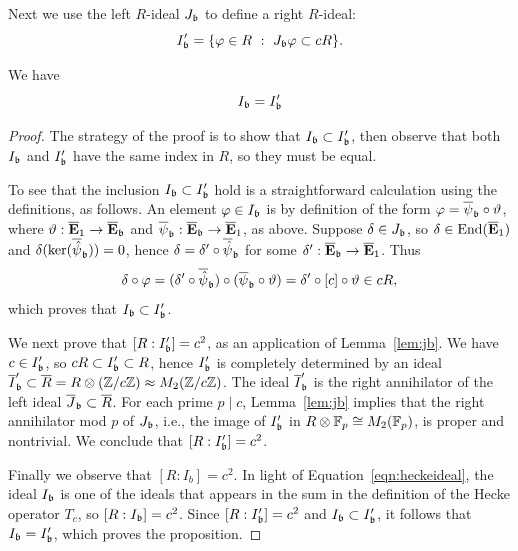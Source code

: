 \documentclass{article} \usepackage[active]{srcltx}
\newcommand{\eE}{\mathbf{E}}
\begin{document}
Next we use the left $R$-ideal $J_{\mathfrak{b}}$ to define a right $R$-ideal:
$$
 I'_{\mathfrak{b}} = \{\varphi \in R\,\, : \,\, J_{\mathfrak{b}} \varphi \subset c R\}.
$$
\begin{proposition}\label{prop:Ichar}
We have 
$$
  I_{\mathfrak{b}} = I'_{\mathfrak{b}}
$$
\end{proposition}
\begin{proof}
  The strategy of the proof is to show that $I_{\mathfrak{b}} \subset
  I'_{\mathfrak{b}}$, then observe that both $I_{\mathfrak{b}}$ and $I'_{\mathfrak{b}}$ have the
  same index in $R$, so they must be equal.

  To see that the inclusion $I_{\mathfrak{b}} \subset I'_{\mathfrak{b}}$ hold is a
  straightforward calculation using the definitions, as follows.  An
  element $\varphi \in I_{\mathfrak{b}}$ is by definition of the form $\varphi
  = \overline{\psi}_{\mathfrak{b}}\circ \vartheta$, where
  $\vartheta:\overline{\eE}_1 \to \overline{\eE}_{\fb}$ and
  $\overline{\psi}_{\fb}: \overline{\eE}_{\fb} \to \overline{\eE}_1$,
  as above.  Suppose $\delta \in J_{\mathfrak{b}}$, so
  $\delta\in \End(\overline{\eE}_1)$ and
  $\delta(\ker(\overline{\hat{\psi}}_{\mathfrak{b}})) = 0$, hence $\delta=
  \delta' \circ \overline{\hat{\psi}}_{\mathfrak{b}}$ for some
  $\delta':\overline{\eE}_\fb \to \overline{\eE}_1$.  Thus
  $$
   \delta \circ \varphi = 
    (\delta' \circ \overline{\hat{\psi}}_{\mathfrak{b}}) \circ (\overline{\psi}_{\mathfrak{b}} \circ \vartheta)
      = \delta' \circ [c] \circ \vartheta \in cR,
  $$
  which proves that $I_{\mathfrak{b}} \subset I'_{\mathfrak{b}}$.

  We next prove that $[R:I'_{\mathfrak{b}}] = c^2$,
  as an application of Lemma~\ref{lem:jb}.  
We have $c\in I'_{\mathfrak{b}}$,
  so $cR \subset I'_{\mathfrak{b}} \subset R$, hence $I'_{\mathfrak{b}}$ is completely
  determined by an ideal $\overline{I}'_{\mathfrak{b}} \subset \overline{R} =
  R\otimes(\mathbb{Z}/c\mathbb{Z}) \approx M_2(\mathbb{Z}/c\mathbb{Z})$.  The ideal
  $\overline{I}'_{\mathfrak{b}}$ is the right annihilator of the left ideal
  $\overline{J}_{\mathfrak{b}} \subset \overline{R}$.  For each prime $p\mid c$,
  Lemma~\ref{lem:jb} implies that the right annihilator mod $p$ of
  $J_{\mathfrak{b}}$, i.e., the image of $I'_{\mathfrak{b}}$ in $R\otimes\mathbb{F}_p\cong
  M_2(\mathbb{F}_p)$, is proper and nontrivial.  We conclude that
  $[R:I'_{\mathfrak{b}}] = c^2$.

  Finally we observe that $[R:I_b] = c^2$.  In light of
  Equation~\eqref{eqn:heckeideal}, the ideal $I_{\mathfrak{b}}$ is one of the
  ideals that appears in the sum in the definition of the Hecke
  operator $T_c$, so $[R:I_{\mathfrak{b}}] = c^2$.  Since $[R:I'_{\mathfrak{b}}] = c^2$
  and $I_{\mathfrak{b}}\subset I'_{\mathfrak{b}}$, it follows that $I_{\mathfrak{b}} = I'_{\mathfrak{b}}$,
  which proves the proposition.
\end{proof}
\end{document}

